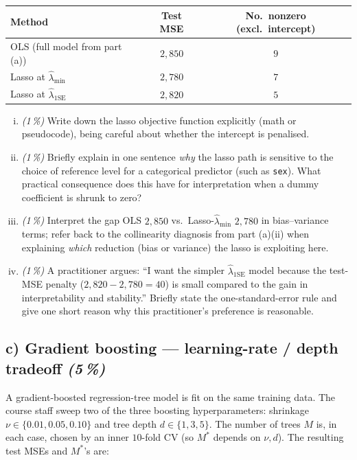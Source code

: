 \documentclass[11pt,a4paper]{article}
\newcommand{\subpoints}[1]{\textit{(#1\,\%)}}
\begin{document}
\begin{center}\small
\begin{tabular}{lcc}
\toprule
\textbf{Method} & \textbf{Test MSE} & \textbf{No.\ nonzero (excl.\ intercept)} \\
\midrule
OLS (full model from part (a))      & $2{,}850$ & $9$ \\
Lasso at $\hat\lambda_{\min}$       & $2{,}780$ & $7$ \\
Lasso at $\hat\lambda_{1\mathrm{SE}}$ & $2{,}820$ & $5$ \\
\bottomrule
\end{tabular}
\end{center}

\begin{enumerate}[(i)]
  \item \subpoints{1} Write down the lasso objective function explicitly (math or pseudocode), being careful about whether the intercept is penalised.
  \item \subpoints{1} Briefly explain in one sentence \emph{why} the lasso path is sensitive to the choice of reference level for a categorical predictor (such as \texttt{sex}). What practical consequence does this have for interpretation when a dummy coefficient is shrunk to zero?
  \item \subpoints{1} Interpret the gap OLS $2{,}850$ vs.\ Lasso-$\hat\lambda_{\min}$ $2{,}780$ in bias--variance terms; refer back to the collinearity diagnosis from part (a)(ii) when explaining \emph{which} reduction (bias or variance) the lasso is exploiting here.
  \item \subpoints{1} A practitioner argues: ``I want the simpler $\hat\lambda_{1\mathrm{SE}}$ model because the test-MSE penalty ($2{,}820 - 2{,}780 = 40$) is small compared to the gain in interpretability and stability.'' Briefly state the one-standard-error rule and give one short reason why this practitioner's preference is reasonable.
\end{enumerate}

\subsection*{c) Gradient boosting --- learning-rate / depth tradeoff \subpoints{5}}

A gradient-boosted regression-tree model is fit on the same training data. The course staff sweep two of the three boosting hyperparameters: shrinkage $\nu \in \{0.01, 0.05, 0.10\}$ and tree depth $d \in \{1, 3, 5\}$. The number of trees $M$ is, in each case, chosen by an inner $10$-fold CV (so $M^*$ depends on $\nu, d$). The resulting test MSEs and $M^*$'s are:
\end{document}
